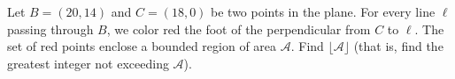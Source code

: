 Let $B = (20, 14)$ and $C = (18, 0)$ be two points in the plane. For every line $\ell$ passing through $B$, we color red the foot of the perpendicular from $C$ to $\ell$.  The set of red points enclose a bounded region of area $\mathcal{A}$. Find $\lfloor \mathcal{A} \rfloor$ (that is, find the greatest integer not exceeding $\mathcal A$).
